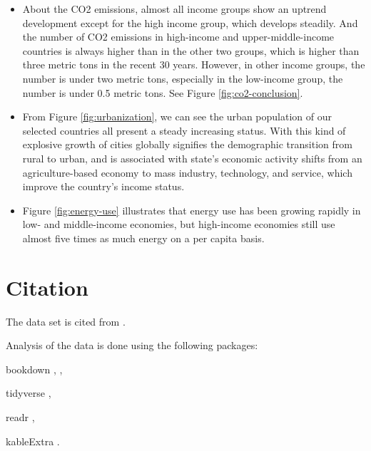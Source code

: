 \documentclass[11pt,a4paper,]{article}
\begin{document}
\begin{itemize}
\item
  About the CO2 emissions, almost all income groups show an uptrend development except for the high income group, which develops steadily. And the number of CO2 emissions in high-income and upper-middle-income countries is always higher than in the other two groups, which is higher than three metric tons in the recent 30 years. However, in other income groups, the number is under two metric tons, especially in the low-income group, the number is under 0.5 metric tons. See Figure \ref{fig:co2-conclusion}.
\item
  From Figure \ref{fig:urbanization}, we can see the urban population of our selected countries all present a steady increasing status. With this kind of explosive growth of cities globally signifies the demographic transition from rural to urban, and is associated with state's economic activity shifts from an agriculture-based economy to mass industry, technology, and service, which improve the country's income status.
\item
  Figure \ref{fig:energy-use} illustrates that energy use has been growing rapidly in low- and middle-income economies, but high-income economies still use almost five times as much energy on a per capita basis.
\end{itemize}

\section*{Citation}

The data set is cited from \textcite{Worldbank}.

Analysis of the data is done using the following packages:

bookdown \textcite{bookdown1}, \textcite{bookdown2},

tidyverse \textcite{tidyverse},

readr \textcite{readr},

kableExtra \textcite{kableExtra}.

\printbibliography
\end{document}
